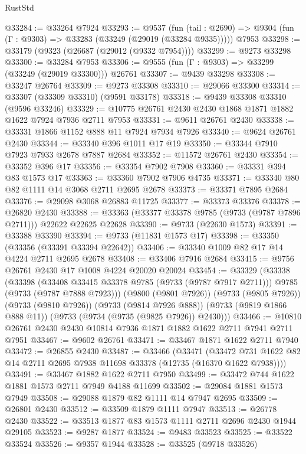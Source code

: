 \begin{lexlean}{RustStd}
\begin{coremodule}
@33284 := @33264 @7924
@33293 := @9537
    (fun (tail : @2690) => @9304 (fun (Γ : @9303) => @33283 (@33249 (@29019 (@33284 @9335)))))
    @7953
@33298 := @33179 (@9323 (@26687 (@29012 (@9332 @7954))))
@33299 := @9273 @33298
@33300 := @33284 @7953
@33306 := @9555 (fun (Γ : @9303) => @33299 (@33249 (@29019 @33300))) @26761
@33307 := @9439 @33298
@33308 := @33247 @26764
@33309 := @9273 @33308
@33310 := @29066 @33300
@33314 := @33307 (@33309 @33310) (@9591 @33178)
@33318 := @9439 @33308 @33310 (@9596 @33246)
@33329 := @10775 @26761 @2430 @2430 @1868 @1871 @1882 @1622 @7924 @7936 @2711 @7953
@33331 := @9611 @26761 @2430
@33338 := @33331 @1866 @1152 @888 @11 @7924 @7934 @7926
@33340 := @9624 @26761 @2430
@33344 := @33340 @396 @1011 @17 @19
@33350 := @33344 @7910 @7923 @7933 @2678 @7887 @2684
@33352 := @11572 @26761 @2430
@33354 := @33352 @396 @17
@33356 := @33354 @7902 @7908
@33360 := @33331 @394 @83 @1573 @17
@33363 := @33360 @7902 @7906 @4735
@33371 := @33340 @80 @82 @1111 @14 @3068 @2711 @2695 @2678
@33373 := @33371 @7895 @2684
@33376 := @29098 @3068 @26883 @11725
@33377 := @33373 @33376
@33378 := @26820 @2430
@33388 := @33363 (@33377 @33378 @9785 (@9733 (@9787 @7896 @2711))) @22622 @22625 @22628
@33390 := @9733 (@22630 @1573)
@33391 := @33388 @33390
@33394 := @9733 (@11831 @1573 @17)
@33398 := @33350 (@33356 (@33391 @33394 @22642))
@33406 := @33340 @1009 @82 @17 @14 @4224 @2711 @2695 @2678
@33408 := @33406 @7916 @2684
@33415 := @9756 @26761 @2430 @17 @1008 @4224 @20020 @20024
@33454 := @33329
    (@33338
      (@33398
        (@33408 @33415 @33378 @9785 (@9733 (@9787 @7917 @2711)))
        @9785
        (@9733 (@9787 @7888 @7923)))
      (@9800 (@9801 @7926))
      (@9733 (@9805 @7926))
      (@9733 (@9810 @7926))
      (@9733 (@9814 @7926 @888))
      (@9733 (@9819 @1866 @888 @11))
      (@9733 (@9734 (@9735 (@9825 @7926)) @2430)))
@33466 := @10810 @26761 @2430 @2430 @10814 @7936 @1871 @1882 @1622 @2711 @7941 @2711 @7951
@33467 := @9602 @26761
@33471 := @33467 @1871 @1622 @2711 @7940
@33472 := @26855 @2430
@33487 := @33466
    (@33471
      (@33472 @731 @1622 @82 @14 @2711 @2695 @7938 @11698 @33378 (@12735 (@16370 @1622 @7938))))
@33491 := @33467 @1882 @1622 @2711 @7950
@33499 := @33472 @744 @1622 @1881 @1573 @2711 @7949 @4188 @11699
@33502 := @29084 @1881 @1573 @7949
@33508 := @29088 @1879 @82 @1111 @14 @7947 @2695
@33509 := @26801 @2430
@33512 := @33509 @1879 @1111 @7947
@33513 := @26778 @2430
@33522 := @33513 @1877 @83 @1573 @1111 @2711 @2696 @2430 @1944 @29105
@33523 := @9287 @1877
@33524 := @9483 @33523
@33525 := @33522 @33524
@33526 := @9357 @1944
@33528 := @33525 (@9718 @33526)

\end{coremodule}
\end{lexlean}
